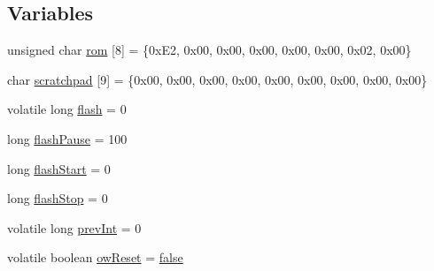 \subsection*{Variables}
\begin{DoxyCompactItemize}
\item 
unsigned char \hyperlink{OWHumidity2_8ino_a8beb78e2b3f2cb6e34f34861a875ca0b}{rom} \mbox{[}8\mbox{]} = \{0x\-E2, 0x00, 0x00, 0x00, 0x00, 0x00, 0x02, 0x00\}
\item 
char \hyperlink{OWHumidity2_8ino_a8248cc51a33adbb2adf4f80c26f0a166}{scratchpad} \mbox{[}9\mbox{]} = \{0x00, 0x00, 0x00, 0x00, 0x00, 0x00, 0x00, 0x00, 0x00\}
\item 
volatile long \hyperlink{OWHumidity2_8ino_a6d286895480000d2c1591098773da92b}{flash} = 0
\item 
long \hyperlink{OWHumidity2_8ino_a698f223721ea29263d602fc917b4750e}{flash\-Pause} = 100
\item 
long \hyperlink{OWHumidity2_8ino_aaf78eebe2bb3002cd3e0445f3009e127}{flash\-Start} = 0
\item 
long \hyperlink{OWHumidity2_8ino_a5614d105569b9f9003a30e7f76b5b53b}{flash\-Stop} = 0
\item 
volatile long \hyperlink{OWHumidity2_8ino_add5ef67690d870c53fac0f0d95438bb1}{prev\-Int} = 0
\item 
volatile boolean \hyperlink{OWHumidity2_8ino_af37159888cdcbe69b079b2c9dbfe3abb}{ow\-Reset} = \hyperlink{stdbool_8h_a65e9886d74aaee76545e83dd09011727}{false}
\end{DoxyCompactItemize}


